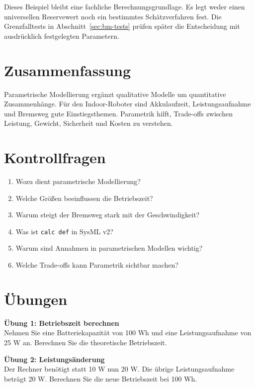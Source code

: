Dieses Beispiel bleibt eine fachliche Berechnungsgrundlage. Es legt weder einen universellen Reservewert noch ein bestimmtes Schätzverfahren fest. Die Grenzfalltests in Abschnitt~\ref{sec:bm-tests} prüfen später die Entscheidung mit ausdrücklich festgelegten Parametern.

\section{Zusammenfassung}
Parametrische Modellierung ergänzt qualitative Modelle um quantitative Zusammenhänge. Für den Indoor-Roboter sind Akkulaufzeit, Leistungsaufnahme und Bremsweg gute Einstiegsthemen. Parametrik hilft, Trade-offs zwischen Leistung, Gewicht, Sicherheit und Kosten zu verstehen.

\section{Kontrollfragen}
\begin{enumerate}
    \item Wozu dient parametrische Modellierung?
    \item Welche Größen beeinflussen die Betriebszeit?
    \item Warum steigt der Bremsweg stark mit der Geschwindigkeit?
    \item Was ist \texttt{calc def} in SysML v2?
    \item Warum sind Annahmen in parametrischen Modellen wichtig?
    \item Welche Trade-offs kann Parametrik sichtbar machen?
\end{enumerate}

\section{Übungen}
\begin{uebungbox}
\textbf{Übung 1: Betriebszeit berechnen}\\
Nehmen Sie eine Batteriekapazität von 100 Wh und eine Leistungsaufnahme von 25 W an. Berechnen Sie die theoretische Betriebszeit.
\end{uebungbox}

\begin{uebungbox}
\textbf{Übung 2: Leistungsänderung}\\
Der Rechner benötigt statt 10 W nun 20 W. Die übrige Leistungsaufnahme beträgt 20 W. Berechnen Sie die neue Betriebszeit bei 100 Wh.
\end{uebungbox}

